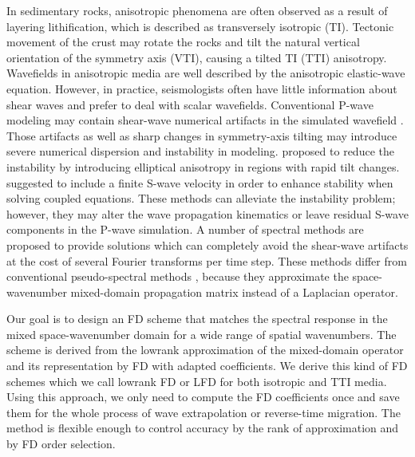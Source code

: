 In sedimentary rocks, anisotropic phenomena are often observed as a result 
of layering lithification, which is described as transversely isotropic (TI). 
Tectonic movement of the crust may rotate the
rocks and tilt the natural vertical orientation
of the symmetry axis
(VTI), causing a tilted TI (TTI) anisotropy. 
Wavefields in anisotropic media are well described by the anisotropic
elastic-wave equation.  
However, in practice, seismologists often have little
information about shear waves and
prefer to deal with scalar wavefields.
Conventional P-wave modeling may contain shear-wave numerical artifacts in the simulated wavefield \cite[]{grechkat,zhang2,duveneckt}.
Those artifacts as well as sharp changes in symmetry-axis tilting may introduce severe numerical
dispersion and instability in modeling.
\cite{yoon} proposed to reduce the instability by introducing elliptical anisotropy in regions
with rapid tilt changes.
\cite{fletcher} suggested to include a finite S-wave velocity in order to enhance stability
when solving coupled equations.
These methods can alleviate the instability problem;
however, they may alter the wave propagation kinematics or leave residual S-wave components in the P-wave simulation.
A number of spectral methods are proposed to provide solutions
which can completely avoid the shear-wave artifacts 
\cite[]{etgen,chu,songx,lr,fowlerg,ge,cheng} at the cost of several Fourier
transforms per time step.
These methods differ from conventional pseudo-spectral methods \cite[]{gazdag,fornberg},
because they approximate the space-wavenumber mixed-domain propagation matrix instead of a Laplacian operator. 

Our goal is to design an FD scheme that matches the spectral response in the mixed space-wavenumber domain for a wide range of spatial wavenumbers.
The scheme is derived from the lowrank approximation of the mixed-domain operator \cite[]{ying,lr} and its representation by FD with adapted coefficients. 
We derive this kind of FD schemes which we call lowrank FD or LFD for both isotropic and TTI media.
Using this approach, we only need to compute the FD coefficients once
and save them for the whole process of wave extrapolation or reverse-time migration.
 The method is flexible enough to control accuracy by the rank of approximation and by FD order selection. 

